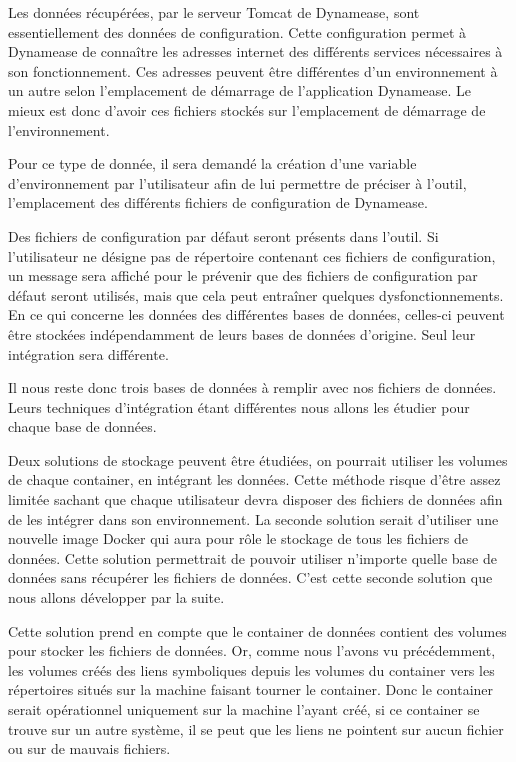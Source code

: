 Les données récupérées, par le serveur Tomcat de Dynamease, sont essentiellement des données de configuration. Cette configuration permet à Dynamease de connaître les adresses internet des différents services nécessaires à son fonctionnement. Ces adresses peuvent être différentes d'un environnement à un autre selon l'emplacement de démarrage de l'application Dynamease. Le mieux est donc d'avoir ces fichiers stockés sur l'emplacement de démarrage de l'environnement.

Pour ce type de donnée, il sera demandé la création d'une variable d'environnement par l'utilisateur afin de lui permettre de préciser à l'outil, l'emplacement des différents fichiers de configuration de Dynamease.

Des fichiers de configuration par défaut seront présents dans l'outil. Si l'utilisateur ne désigne pas de répertoire contenant ces fichiers de configuration, un message sera affiché pour le prévenir que des fichiers de configuration par défaut seront utilisés, mais que cela peut entraîner quelques dysfonctionnements.\\

En ce qui concerne les données des différentes bases de données, celles-ci peuvent être stockées indépendamment de leurs bases de données d'origine. Seul leur intégration sera différente.

Il nous reste donc trois bases de données à remplir avec nos fichiers de données. Leurs techniques d'intégration étant différentes nous allons les étudier pour chaque base de données. 

Deux solutions de stockage peuvent être étudiées, on pourrait utiliser les volumes de chaque container, en intégrant les données. Cette méthode risque d'être assez limitée sachant que chaque utilisateur devra disposer des fichiers de données afin de les intégrer dans son environnement. La seconde solution serait d'utiliser une nouvelle image Docker qui aura pour rôle le stockage de tous les fichiers de données. Cette solution permettrait de pouvoir utiliser n'importe quelle base de données sans récupérer les fichiers de données. C'est cette seconde solution que nous allons développer par la suite.

Cette solution prend en compte que le container de données contient des volumes pour stocker les fichiers de données. Or, comme nous l'avons vu précédemment, les volumes créés des liens symboliques depuis les volumes du container vers les répertoires situés sur la machine faisant tourner le container. Donc le container serait opérationnel uniquement sur la machine l'ayant créé, si ce container se trouve sur un autre système, il se peut que les liens ne pointent sur aucun fichier ou sur de mauvais fichiers.

